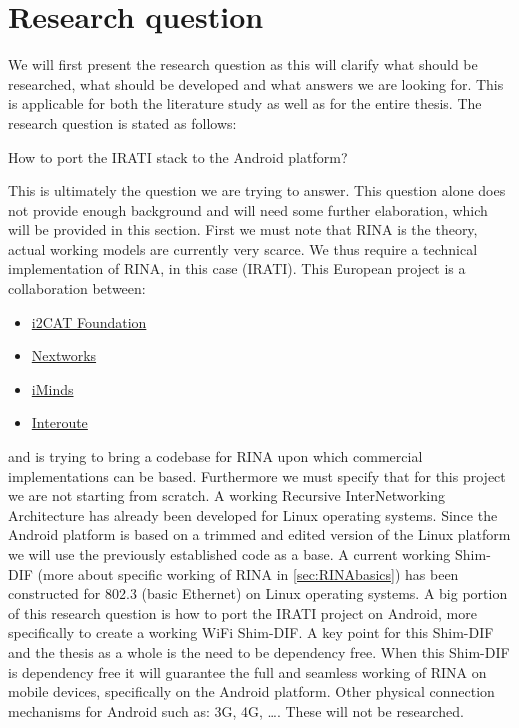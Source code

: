 \section{Research question}
\label{sec:research_question}
We will first present the research question as this will clarify what should be researched, what should be developed and what answers we are looking for. This is applicable for both the literature study as well as for the entire thesis. 
\npar
The research question is stated as follows: \\
\begin{highlight}How to port the IRATI stack to the Android platform?\end{highlight}
This is ultimately the question we are trying to answer. This question alone does not provide enough background and will need some further elaboration, which will be provided in this section. 
\npar
First we must note that RINA is the theory, actual working models are currently very scarce. We thus require a technical implementation of RINA, in this case  (IRATI). This European project is a collaboration between: 
\begin{itemize}
	\item \href{http://www.i2cat.net/en}{i2CAT Foundation}
	\item \href{http://www.nextworks.it}{Nextworks}
	\item \href{http://www.iminds.be/en}{iMinds}
	\item \href{http://www.interoute.com/}{Interoute}
\end{itemize}
and is trying to bring a codebase for RINA upon which commercial implementations can be based. Furthermore we must specify that for this project we are not starting from scratch. A working Recursive InterNetworking Architecture has already been developed for Linux operating systems. Since the Android platform is based on a trimmed and edited version of the Linux platform we will use the previously established code as a base. 
\npar
A current working Shim-DIF (more about specific working of RINA in \ref{sec:RINAbasics}) has been constructed for 802.3 (basic Ethernet) on Linux operating systems. A big portion of this research question is how to port the IRATI project on Android, more specifically to create a working WiFi Shim-DIF. A key point for this Shim-DIF and the thesis as a whole is the need to be dependency free. When this Shim-DIF is dependency free it will guarantee the full and seamless working of RINA on mobile devices, specifically on the Android platform. Other physical connection mechanisms for Android such as: 3G, 4G, \ldots. These will not be researched.
